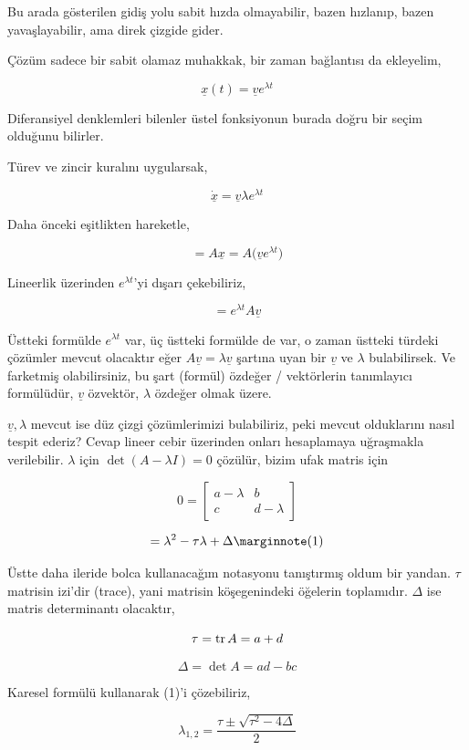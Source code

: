 \documentclass[12pt,fleqn]{article}\usepackage{../../common}
\begin{document}
Bu arada gösterilen gidiş yolu sabit hızda olmayabilir, bazen hızlanıp, bazen
yavaşlayabilir, ama direk çizgide gider. 

Çözüm sadece bir sabit olamaz muhakkak, bir zaman bağlantısı da ekleyelim,

$$
\underline{x}(t) = \underline{v} e ^{\lambda t}
$$

Diferansiyel denklemleri bilenler üstel fonksiyonun burada doğru bir seçim
olduğunu bilirler. 

Türev ve zincir kuralını uygularsak,

$$
\dot{\underline{x}} = \underline{v} \lambda e ^{\lambda t} 
$$

Daha önceki eşitlikten hareketle,

$$
= A \underline{x} = A \big( \underline{v} e ^{\lambda t} \big)
$$

Lineerlik üzerinden $e ^{\lambda t}$'yi dışarı çekebiliriz,

$$
= e ^{\lambda t} A \underline{v}
$$

Üstteki formülde $e^{\lambda t}$ var, üç üstteki formülde de var, o zaman
üstteki türdeki çözümler mevcut olacaktır eğer $A
\underline{v}=\lambda\underline{v}$ şartına uyan bir $\underline{v}$ ve $\lambda$
bulabilirsek. Ve farketmiş olabilirsiniz, bu şart (formül) özdeğer / vektörlerin
tanımlayıcı formülüdür, $\underline{v}$ özvektör, $\lambda$ özdeğer olmak üzere.

$\underline{v},\lambda$ mevcut ise düz çizgi çözümlerimizi bulabiliriz, peki
mevcut olduklarını nasıl tespit ederiz? Cevap lineer cebir üzerinden onları
hesaplamaya uğraşmakla verilebilir. $\lambda$ için $\det (A - \lambda I) = 0$
çözülür, bizim ufak matris için

$$
0 = \left[\begin{array}{rr}
a-\lambda & b \\ c & d-\lambda
\end{array}\right]
$$

$$ 
= \lambda^2 - \tau \lambda + \Delta 
\mlabel{1} 
$$

Üstte daha ileride bolca kullanacağım notasyonu tanıştırmış oldum bir
yandan. $\tau$ matrisin izi'dir (trace), yani matrisin köşegenindeki öğelerin
toplamıdır. $\Delta$ ise matris determinantı olacaktır,

$$ \tau = \operatorname{tr} A = a + d$$

$$ \Delta = \det A = ad - bc $$

Karesel formülü kullanarak (1)'i çözebiliriz,

$$ \lambda_{1,2} = \frac{\tau \pm \sqrt{\tau^2-4\Delta}}{2} $$
\end{document}
